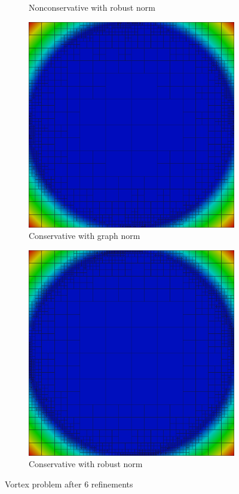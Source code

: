 \documentclass[letterpaper]{article}
\begin{document}
\begin{figure}
\begin{subfigure}[t]{0.45\textwidth}
\caption{Nonconservative with robust norm}
\label{fig:vortexRobust6nc}
\end{subfigure}
\begin{subfigure}[t]{0.45\textwidth}
\centering
\includegraphics[width=\textwidth]{figs/Vortex/graph6c.png}
\caption{Conservative with graph norm}
\label{fig:vortexGraph6c}
\end{subfigure}
\begin{subfigure}[t]{0.45\textwidth}
\centering
\includegraphics[width=\textwidth]{figs/Vortex/robust6c.png}
\caption{Conservative with robust norm}
\label{fig:vortexRobust6c}
\end{subfigure}
\caption{Vortex problem after 6 refinements}
\label{fig:vortex}
\end{figure}
\end{document}

